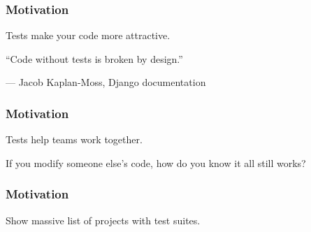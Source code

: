 \begin{frame}[fragile]
  \frametitle{Motivation}
  Tests make your code more attractive.
  \epigraph{``Code without tests is broken by design.''}{--- \textup{Jacob Kaplan-Moss}, Django documentation}
\end{frame}

\begin{frame}
  \frametitle{Motivation}
  Tests help teams work together.

  If you modify someone else's code, how do you know it all still works?
\end{frame}

\begin{frame}
  \frametitle{Motivation}
  Show massive list of projects with test suites.
\end{frame}
